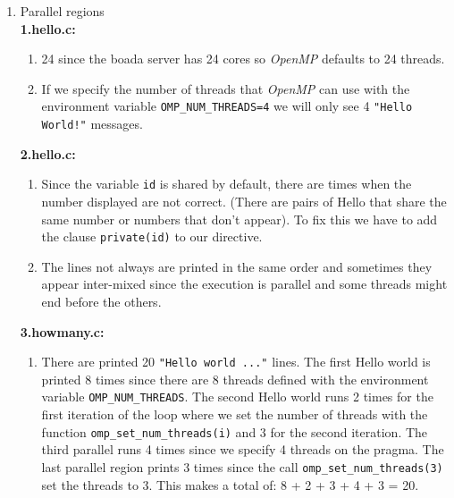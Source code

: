 
\begin{enumerate}[label=\Alph*)]
    \item Parallel regions \\
    \textbf{1.hello.c:}
    \begin{enumerate}[label=\arabic*.]
        \item 24 since the boada server has 24 cores so \emph{OpenMP} defaults to 24 threads.
        \item If we specify the number of threads that \emph{OpenMP} can use with the environment variable \texttt{OMP\_NUM\_THREADS=4} we will only
        see 4 \texttt{"Hello World!"} messages.
    \end{enumerate}
    \textbf{2.hello.c:}
    \begin{enumerate}[label=\arabic*.]
        \item Since the variable \texttt{id} is shared by default, there are times when the number displayed are not correct.
        (There are pairs of Hello that share the same number or numbers that don't appear). To fix this we have to add
        the clause \texttt{private(id)} to our directive.
        \item The lines not always are printed in the same order and sometimes they appear inter-mixed since the execution is parallel and some threads might end before the others.
    \end{enumerate}
    \textbf{3.howmany.c:}
    \begin{enumerate}[label=\arabic*.]
        \item There are printed 20 \texttt{"Hello world ..."} lines.
        The first Hello world is printed 8 times since there are 8 threads defined with the environment
        variable \texttt{OMP\_NUM\_THREADS}. The second Hello world runs 2 times for the first iteration of
        the loop where we set the number of threads with the function \texttt{omp\_set\_num\_threads(i)} and
        3 for the second iteration. The third parallel runs 4 times since we specify 4 threads on the
        pragma. The last parallel region prints 3 times since the call \texttt{omp\_set\_num\_threads(3)} 
        set the threads to 3. This makes a total of:  8 + 2 + 3 + 4 + 3 = 20.

\end{enumerate}
\end{enumerate}
